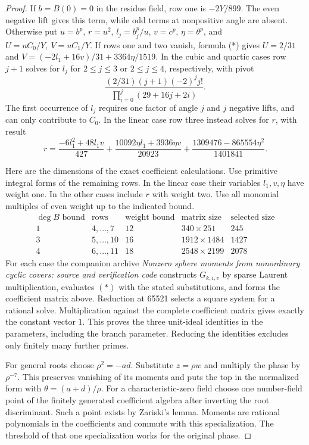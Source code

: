 \documentclass[11pt]{article}
\begin{document}
\begin{proof}
If \(b=B(0)=0\) in the residue field, row one is
\(-2Y/899\). The even negative lift gives this term, while odd
terms at nonpositive angle are absent. Otherwise put
\(u=b^p\), \(r=u^2\), \(l_j=b_j^p/u\), \(v=c^p\),
\(\eta=\theta^p\), and \(U=uC_0/Y,\ V=uC_1/Y\).
If rows one and two vanish, formula (*) gives
\(U=2/31\) and \(V=(-2l_1+16v)/31+3364\eta/1519\).
In the cubic and quartic cases row \(j+1\) solves for \(l_j\)
for \(2\le j\le3\) or \(2\le j\le4\), respectively, with pivot
\[
 \frac{(2/31)(j+1)(-2)^j j!}{\prod_{i=0}^j(29+16j+2i)} .
\]
The first occurrence of \(l_j\) requires one factor of angle
\(j\) and \(j\) negative lifts, and can only contribute to
\(C_0\). In the linear case row three instead solves for
\(r\), with result
\[
 r=\frac{-6l_1^2+48l_1v}{427}
  +\frac{10092\eta l_1+3936\eta v}{20923}
  +\frac{1309476-865554\eta^2}{1401841}.
\]

Here are the dimensions of the exact coefficient calculations.
Use primitive integral forms of the remaining rows. In the
linear case their variables \(l_1,v,\eta\) have weight one.
In the other cases include \(r\) with weight two. Use all
monomial multiples of even weight up to the indicated bound.
\[
\begin{array}{c|c|r|r|r}
 \deg B\text{ bound}&\text{rows}&\text{weight bound}
                    &\text{matrix size}&\text{selected size}\\ \hline
 1&4,\ldots,7 &12&340\times251&245\\
 3&5,\ldots,10&16&1912\times1484&1427\\
 4&6,\ldots,11&18&2548\times2199&2078
\end{array}
\]
For each case the companion archive
\emph{Nonzero sphere moments from nonordinary cyclic covers:
source and verification code} constructs \(G_{k,i,v}\) by sparse
Laurent multiplication, evaluates \((*)\) with the stated
substitutions, and forms the coefficient matrix above.
Reduction at 65521 selects a square system for a rational
solve. Multiplication against the complete coefficient matrix
gives exactly the constant vector \(1\). This proves the
three unit-ideal identities in the parameters, including the
branch parameter. Reducing the identities excludes only
finitely many further primes.

For general roots choose \(\rho^2=-ad\). Substitute
\(z=\rho w\) and multiply the phase by \(\rho^{-7}\).
This preserves vanishing of its moments and puts the top in
the normalized form with \(\theta=(a+d)/\rho\). For a
characteristic-zero field choose one number-field point of the
finitely generated coefficient algebra after inverting the
root discriminant. Such a point exists by Zariski's lemma.
Moments are rational polynomials in the coefficients and
commute with this specialization. The threshold of that one
specialization works for the original phase.
\end{proof}
\end{document}

